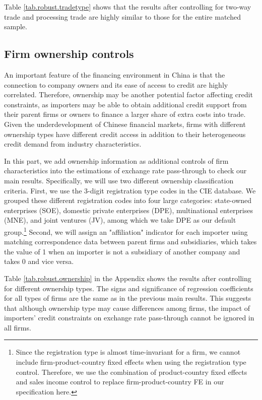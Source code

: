 \documentclass[12pt]{article}
\begin{document}
Table \ref{tab.robust.tradetype} shows that the results after controlling for two-way trade and processing trade are highly similar to those for the entire matched sample.

\subsection{Firm ownership controls}

An important feature of the financing environment in China is that the connection to company owners and its ease of access to credit are highly correlated. Therefore, ownership may be another potential factor affecting credit constraints, as importers may be able to obtain additional credit support from their parent firms or owners to finance a larger share of extra costs into trade. Given the underdevelopment of Chinese financial markets, firms with different ownership types have different credit access in addition to their heterogeneous credit demand from industry characteristics. 

In this part, we add ownership information as additional controls of firm characteristics into the estimations of exchange rate pass-through to check our main results. Specifically, we will use two different ownership classification criteria. First, we use the 3-digit registration type codes in the CIE database. We grouped these different registration codes into four large categories: state-owned enterprises (SOE), domestic private enterprises (DPE), multinational enterprises (MNE), and joint ventures (JV), among which we take DPE as our default group.\footnote{Since the registration type is almost time-invariant for a firm, we cannot include firm-product-country fixed effects when using the registration type control. Therefore, we use the combination of product-country fixed effects and sales income control to replace firm-product-country FE in our specification here.} Second, we will assign an "affiliation" indicator for each importer using matching correspondence data between parent firms and subsidiaries, which takes the value of 1 when an importer is not a subsidiary of another company and takes 0 and vice versa.

Table \ref{tab.robust.ownership} in the Appendix shows the results after controlling for different ownership types. The signs and significance of regression coefficients for all types of firms are the same as in the previous main results. This suggests that although ownership type may cause differences among firms, the impact of importers' credit constraints on exchange rate pass-through cannot be ignored in all firms.
\end{document}
